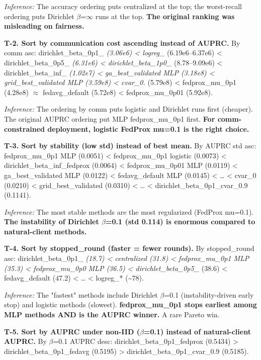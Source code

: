 \documentclass{article}
\begin{document}
\emph{Inference:} The accuracy ordering puts centralized at the top; the worst-recall ordering puts Dirichlet \ensuremath{\beta}=\ensuremath{\infty} runs at the top. \textbf{The original ranking was misleading on fairness.}


\textbf{T-2. Sort by communication cost ascending instead of AUPRC.} By comm asc: dirichlet\_beta\_0p1\_\emph{ (3.06e6) < logreg\_} (6.19e6--6.37e6) < dirichlet\_beta\_0p5\_\emph{ (6.31e6) < dirichlet\_beta\_1p0\_} (8.78--9.09e6) < dirichlet\_beta\_inf\_\emph{ (1.02e7) < ga\_best\_validated MLP (3.18e8) < grid\_best\_validated MLP (3.59e8) < cvar\_0.} (5.79e8) < fedprox\_mu\_0p1 (4.28e8) \ensuremath{\approx} fedavg\_default (5.72e8) < fedprox\_mu\_0p01 (5.92e8).


\emph{Inference:} The ordering by comm puts logistic and Dirichlet runs first (cheaper). The original AUPRC ordering put MLP fedprox\_mu\_0p1 first. \textbf{For comm-constrained deployment, logistic FedProx mu=0.1 is the right choice.}


\textbf{T-3. Sort by stability (low std) instead of best mean.} By AUPRC std asc: fedprox\_mu\_0p1 MLP (0.0051) < fedprox\_mu\_0p1 logistic (0.0073) < dirichlet\_beta\_inf\_fedprox (0.0064) < fedprox\_mu\_0p01 MLP (0.0119) < ga\_best\_validated MLP (0.0122) < fedavg\_default MLP (0.0145) < \ldots{} < cvar\_0 (0.0210) < grid\_best\_validated (0.0310) < \ldots{} < dirichlet\_beta\_0p1\_cvar\_0.9 (0.1141).


\emph{Inference:} The most stable methods are the most regularized (FedProx mu=0.1). \textbf{The instability of Dirichlet \ensuremath{\beta}=0.1 (std 0.114) is enormous compared to natural-client methods.}


\textbf{T-4. Sort by stopped\_round (faster = fewer rounds).} By stopped\_round asc: dirichlet\_beta\_0p1\_\emph{ (18.7) < centralized (31.8) < fedprox\_mu\_0p1 MLP (35.3) < fedprox\_mu\_0p0 MLP (36.5) < dirichlet\_beta\_0p5\_} (38.6) < fedavg\_default (47.2) < \ldots{} < logreg\_* (\textasciitilde{}78).


\emph{Inference:} The "fastest" methods include Dirichlet \ensuremath{\beta}=0.1 (instability-driven early stop) and logistic methods (slowest). \textbf{fedprox\_mu\_0p1 stops earliest among MLP methods AND is the AUPRC winner.} A rare Pareto win.


\textbf{T-5. Sort by AUPRC under non-IID (\ensuremath{\beta}=0.1) instead of natural-client AUPRC.} By \ensuremath{\beta}=0.1 AUPRC desc: dirichlet\_beta\_0p1\_fedprox (0.5434) > dirichlet\_beta\_0p1\_fedavg (0.5195) > dirichlet\_beta\_0p1\_cvar\_0.9 (0.5185).
\end{document}
